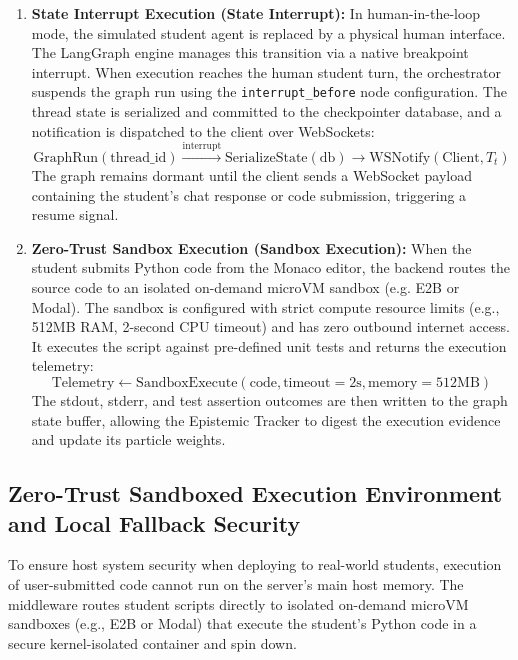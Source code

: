 \documentclass[11pt,a4paper]{report}
\begin{document}
\begin{enumerate}
    \item \textbf{State Interrupt Execution (State Interrupt):} In human-in-the-loop mode, the simulated student agent is replaced by a physical human interface. The LangGraph engine manages this transition via a native breakpoint interrupt. When execution reaches the human student turn, the orchestrator suspends the graph run using the \texttt{interrupt\_before} node configuration. The thread state is serialized and committed to the checkpointer database, and a notification is dispatched to the client over WebSockets:
    \begin{equation}
        \text{GraphRun}(\text{thread\_id}) \xrightarrow{\text{interrupt}} \text{SerializeState}(\text{db}) \to \text{WSNotify}(\text{Client}, T_t)
    \end{equation}
    The graph remains dormant until the client sends a WebSocket payload containing the student's chat response or code submission, triggering a resume signal.
    
    \item \textbf{Zero-Trust Sandbox Execution (Sandbox Execution):} When the student submits Python code from the Monaco editor, the backend routes the source code to an isolated on-demand microVM sandbox (e.g. E2B or Modal). The sandbox is configured with strict compute resource limits (e.g., 512MB RAM, 2-second CPU timeout) and has zero outbound internet access. It executes the script against pre-defined unit tests and returns the execution telemetry:
    \begin{equation}
        \text{Telemetry} \gets \text{SandboxExecute}\left(\text{code}, \text{timeout} = 2\text{s}, \text{memory} = 512\text{MB}\right)
    \end{equation}
    The stdout, stderr, and test assertion outcomes are then written to the graph state buffer, allowing the Epistemic Tracker to digest the execution evidence and update its particle weights.
\end{enumerate}

\subsection{Zero-Trust Sandboxed Execution Environment and Local Fallback Security}
To ensure host system security when deploying to real-world students, execution of user-submitted code cannot run on the server's main host memory. The middleware routes student scripts directly to isolated on-demand microVM sandboxes (e.g., E2B or Modal) that execute the student's Python code in a secure kernel-isolated container and spin down. 
\end{document}
